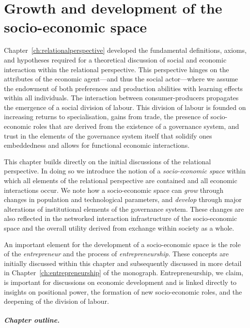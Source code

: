 \chapter{Growth and development of the socio-economic space}
\label{ch:relationaltheory}

Chapter~\ref{ch:relationalperspective} developed the fundamental definitions, axioms, and hypotheses required for a theoretical discussion of social and economic interaction within the relational perspective. This perspective hinges on the attributes of the economic agent---and thus the social actor---where we assume the endowment of both preferences and production abilities with learning effects within all individuals. The interaction between consumer-producers propagates the emergence of a social division of labour. This division of labour is founded on increasing returns to specialisation, gains from trade, the presence of socio-economic roles that are derived from the existence of a governance system, and trust in the elements of the governance system itself that solidify ones embeddedness and allows for functional economic interactions.

This chapter builds directly on the initial discussions of the relational perspective. In doing so we introduce the notion of a \emph{socio-economic space} within which all elements of the relational perspective are contained and all economic interactions occur. We note how a socio-economic space can \emph{grow} through changes in population and technological parameters, and \emph{develop} through major alterations of institutional elements of the governance system. These changes are also reflected in the networked interaction infrastructure of the socio-economic space and the overall utility derived from exchange within society as a whole.

An important element for the development of a socio-economic space is the role of the \emph{entrepreneur} and the process of \emph{entrepreneurship}. These concepts are initially discussed within this chapter and subsequently discussed in more detail in Chapter~\ref{ch:entrepreneurship} of the monograph. Entrepreneurship, we claim, is important for discussions on economic development and is linked directly to insights on positional power, the formation of new socio-economic roles, and the deepening of the division of labour.

\paragraph{Chapter outline.}


